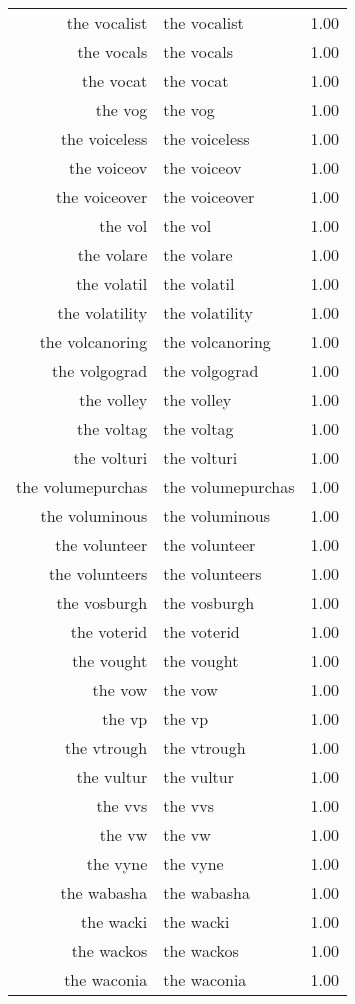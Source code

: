 \begin{table}[ht]
\begin{tabular}{rlr}
  the vocalist & the vocalist & 1.00 \\ 
  the vocals & the vocals & 1.00 \\ 
  the vocat & the vocat & 1.00 \\ 
  the vog & the vog & 1.00 \\ 
  the voiceless & the voiceless & 1.00 \\ 
  the voiceov & the voiceov & 1.00 \\ 
  the voiceover & the voiceover & 1.00 \\ 
  the vol & the vol & 1.00 \\ 
  the volare & the volare & 1.00 \\ 
  the volatil & the volatil & 1.00 \\ 
  the volatility & the volatility & 1.00 \\ 
  the volcanoring & the volcanoring & 1.00 \\ 
  the volgograd & the volgograd & 1.00 \\ 
  the volley & the volley & 1.00 \\ 
  the voltag & the voltag & 1.00 \\ 
  the volturi & the volturi & 1.00 \\ 
  the volumepurchas & the volumepurchas & 1.00 \\ 
  the voluminous & the voluminous & 1.00 \\ 
  the volunteer & the volunteer & 1.00 \\ 
  the volunteers & the volunteers & 1.00 \\ 
  the vosburgh & the vosburgh & 1.00 \\ 
  the voterid & the voterid & 1.00 \\ 
  the vought & the vought & 1.00 \\ 
  the vow & the vow & 1.00 \\ 
  the vp & the vp & 1.00 \\ 
  the vtrough & the vtrough & 1.00 \\ 
  the vultur & the vultur & 1.00 \\ 
  the vvs & the vvs & 1.00 \\ 
  the vw & the vw & 1.00 \\ 
  the vyne & the vyne & 1.00 \\ 
  the wabasha & the wabasha & 1.00 \\ 
  the wacki & the wacki & 1.00 \\ 
  the wackos & the wackos & 1.00 \\ 
  the waconia & the waconia & 1.00 \\ 

\end{tabular}
\end{table}
